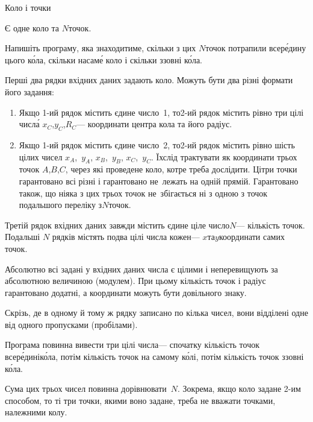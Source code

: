 \begin{problemAllDefault}{Коло і точки}

Є одне коло та $N$\nolinebreak[3] точок. 

\Task	Напишіть програму, яка знаходитиме, скільки з цих $N$\nolinebreak[3] точок потрапили всер\'{е}\-дину цього к\'{о}ла, скільки на\nolinebreak[3] сам\'{е} коло і скільки ззовні к\'{о}ла.


\InputFile  Перші два рядки вхідних даних задають коло. Можуть бути два різні формати його задання:
\begin{enumerate}
\item
Якщо \mbox{1-ий} рядок містить єдине число~1, то\nolinebreak[3] \mbox{2-ий} рядок містить рівно три цілі числ\'{а} $x_C$,\nolinebreak[3] $y_C$,\nolinebreak[2] $R_C$\nolinebreak[3] --- координати центра кола та його радіус.
\item
Якщо \mbox{1-ий} рядок містить єдине число~2, то\nolinebreak[3] \mbox{2-ий} рядок містить рівно шість цілих чисел $x_A$,~$y_A$, $x_B$,~$y_B$, $x_C$,~$y_C$. Їх\nolinebreak[2] слід трактувати як координати трьох точок $A$,\nolinebreak[3] $B$,\nolinebreak[3] $C$, через які проведене коло, котре треба дослідити. Ці\nolinebreak[2] три точки гарантовано всі різні і гарантовано не~лежать на одній прямій. Гарантовано також, що ніяка з цих трьох точок не~збігається ні з одною з точок подальшого переліку з\nolinebreak[3] $N$\nolinebreak[3] точок.
\end{enumerate}

Третій рядок вхідних даних завжди містить єдине ціле число\nolinebreak[3] $N$\nolinebreak[3] --- кількість точок. Подальші $N$ рядків містять по\nolinebreak[2] два цілі числа кожен\nolinebreak[3] --- $x$\nolinebreak[3] та\nolinebreak[1] $y$\nolinebreak[2] координати самих точок.

Абсолютно всі задані у вхідних даних числа є цілими і не\nolinebreak[3] перевищують за абсолютною величиною (модулем). При цьому кількість точок і радіус гарантовано додатні, а координати можуть бути довільного знаку.

Скрізь, де в одному й тому ж рядку записано по кілька чисел, вони відділені одне від одного пропусками (пробілами).


\OutputFile Програма повинна вивести три цілі числа\nolinebreak[3] --- спочатку кількість точок всер\'{е}\-дині\nolinebreak[2] к\'{о}ла, потім кількість точок на самому к\'{о}лі, потім кількість точок ззовні к\'{о}ла.

Сума цих трьох чисел повинна дорівнювати~$N$. Зокрема, якщо коло задане \mbox{2-им} способом, то ті три точки, якими воно задане, треба не вважати точками, належними колу.


\end{problemAllDefault}
